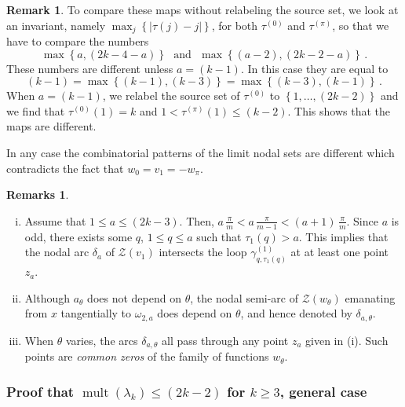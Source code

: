 \documentclass[12pt,a4paper]{amsart}
\theoremstyle{plain} %
\theoremstyle{definition}
\newtheorem{remark}[theorem]{Remark}
\newtheorem{remarks}[theorem]{Remarks}
\numberwithin{equation}{section}
\numberwithin{figure}{section}
\numberwithin{table}{section}
\newcommand{\cZ}{\mathcal{Z}}
\DeclareMathOperator{\mult}{mult}
\newcommand{\set}[1]{\left\lbrace #1 \right\rbrace}
\begin{document}
\begin{remark}
 To compare these maps without relabeling the source set, we look at an invariant, namely $\max_j\set{|\tau(j) - j|}$, for both $\tau^{(0)}$ and $\tau^{(\pi)}$, so that we have to compare the numbers
%
\begin{equation*}
\max\set{a,(2k-4-a)} \text{~~and~~} \max\set{ (a-2),(2k-2-a)}\,.
\end{equation*}
%
These numbers are different unless $a=(k-1)$. In this case they are equal to
%
\begin{equation*}
(k-1) = \max\set{(k-1),(k-3)} = \max\set{(k-3),(k-1)}\,.
\end{equation*}
%
When $a=(k-1)$, we relabel the source set of $\tau^{(0)}$ to $\set{1,\ldots,(2k-2)}$ and we find that $\tau^{(0)}(1) = k$ and $1 < \tau^{(\pi)}(1) \le (k-2)$. This shows that the maps are different.\medskip

In any case the combinatorial patterns of the limit nodal sets are different which contradicts the fact that $w_0 = v_1 = - w_{\pi}$.
\end{remark}

\begin{remarks}\label{R-hmn-202}\phantom{}
\begin{enumerate}[(i)]
  \item Assume that $1 \le a \le (2k-3)$. Then, $a\, \frac{\pi}{m} < a\, \frac{\pi}{m-1} < (a+1)\, \frac{\pi}{m}$. Since $a$ is odd, there exists some $q$, $1 \le q \le a$ such that $\tau_1(q) > a$. This implies that the nodal arc $\delta_a$ of $\cZ(v_1)$ intersects the loop $\gamma^{(1)}_{q,\tau_1(q)}$ at at least one point $z_a$.
  \item Although $a_{\theta}$ does not depend on $\theta$, the nodal semi-arc of $\cZ(w_{\theta})$ emanating from $x$ tangentially to $\omega_{2,a}$ does depend on $\theta$, and hence denoted by  $\delta_{a,\theta}$.
  \item When $\theta$ varies, the arcs $\delta_{a,\theta}$ all pass through any point $z_a$ given in (i). Such points are \emph{common zeros} of the family of functions $w_{\theta}$.
\end{enumerate}
\end{remarks}%



\subsubsection{Proof that $\mult(\lambda_k) \le (2k -2)$ for $k \ge 3$, general case}\label{SS-hmn-26}\phantom{}
\end{document}
